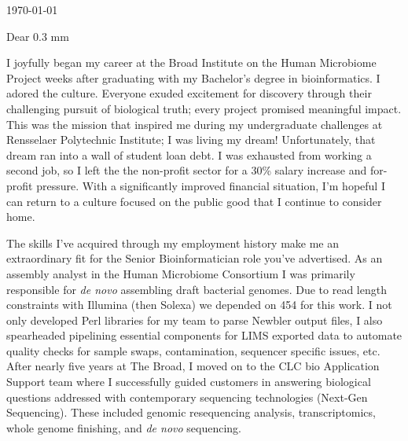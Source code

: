 \documentclass[10pt,letterpaper]{article}
\newcommand{\titleto}[1]{\renewcommand{\titleto}{#1}}
\newcommand{\nameto}[1]{\renewcommand{\nameto}{#1}}
\newcommand{\addrto}[1]{\renewcommand{\addrto}{#1}}
\begin{document}

\begin{flushright}
    \today
\end{flushright}


\nameto
\addrto


Dear \titleto \hspace{0.3 mm} \nameto,


I joyfully began my career at the Broad Institute on the Human Microbiome Project weeks after graduating with my Bachelor’s degree in bioinformatics. I adored the culture. Everyone exuded excitement for discovery through their challenging pursuit of biological truth; every project promised meaningful impact. This was the mission that inspired me during my undergraduate challenges at Rensselaer Polytechnic Institute; I was living my dream! Unfortunately, that dream ran into a wall of student loan debt. I was exhausted from working a second job, so I left the the non-profit sector for a  30\% salary increase and for-profit pressure. With a significantly improved financial situation, I'm hopeful I can return to a culture focused on the public good that I continue to consider home.


The skills I've acquired through my employment history make me an extraordinary fit for the Senior Bioinformatician role you've advertised. As an assembly analyst in the Human Microbiome Consortium I was primarily responsible for \textit{de novo} assembling draft bacterial genomes. Due to read length constraints with Illumina (then Solexa) we depended on 454 for this work. I not only developed Perl libraries for my team to parse Newbler output files, I also spearheaded pipelining essential components for LIMS exported data to automate quality checks for sample swaps, contamination, sequencer specific issues, etc. After nearly five years at The Broad, I moved on to the CLC bio Application Support team where I successfully guided customers in answering biological questions addressed with contemporary sequencing technologies (Next-Gen Sequencing). These included genomic resequencing analysis, transcriptomics, whole genome finishing, and \textit{de novo} sequencing.
\end{document}

